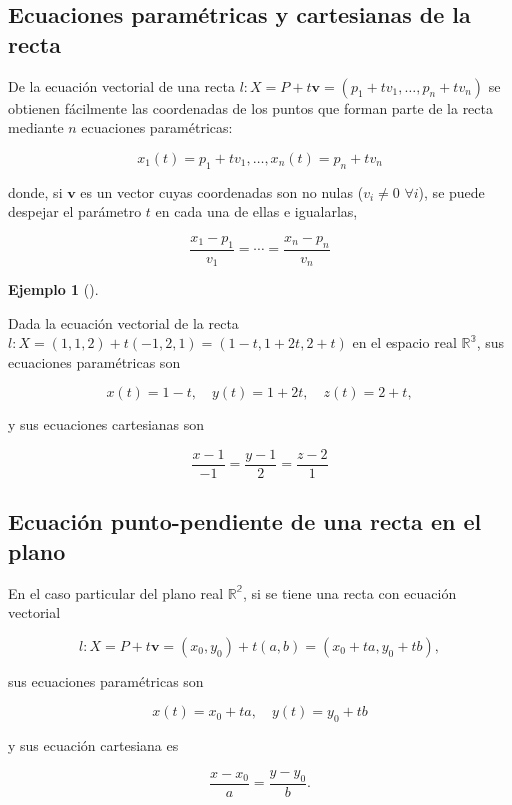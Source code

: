 \documentclass[
  a4paper,
]{scrreport}
\theoremstyle{definition}
\newtheorem{example}{Ejemplo}[chapter]
\theoremstyle{plain}
\theoremstyle{definition}
\theoremstyle{definition}
\theoremstyle{plain}
\theoremstyle{plain}
\theoremstyle{remark}
\begin{document}
\subsection{Ecuaciones paramétricas y cartesianas de la
recta}\label{ecuaciones-paramuxe9tricas-y-cartesianas-de-la-recta}

De la ecuación vectorial de una recta
\(l: X=P + t\mathbf{v}=(p_1+tv_1,\ldots,p_n+tv_n)\) se obtienen
fácilmente las coordenadas de los puntos que forman parte de la recta
mediante \(n\) ecuaciones paramétricas:

\[
x_1(t)=p_1+tv_1, \ldots, x_n(t)=p_n+tv_n
\]

donde, si \(\mathbf{v}\) es un vector cuyas coordenadas son no nulas
(\(v_i\neq 0\) \(\forall i\)), se puede despejar el parámetro \(t\) en
cada una de ellas e igualarlas,

\[
\frac{x_1-p_1}{v_1} = \cdots = \frac{x_n-p_n}{v_n}
\]

\begin{example}[]\protect\hypertarget{exm-ecuaciones-parametrica-cartesiana-recta}{}\label{exm-ecuaciones-parametrica-cartesiana-recta}

Dada la ecuación vectorial de la recta
\(l: X=(1,1,2)+t(-1,2,1) =(1-t,1+2t,2+t)\) en el espacio real
\(\mathbb{R^3}\), sus ecuaciones paramétricas son

\[
x(t) = 1-t, \quad y(t)=1+2t, \quad z(t)=2+t,
\]

y sus ecuaciones cartesianas son

\[
\frac{x-1}{-1}=\frac{y-1}{2}=\frac{z-2}{1}
\]

\end{example}

\subsection{Ecuación punto-pendiente de una recta en el
plano}\label{ecuaciuxf3n-punto-pendiente-de-una-recta-en-el-plano}

En el caso particular del plano real \(\mathbb{R^2}\), si se tiene una
recta con ecuación vectorial

\[
l: X=P+t\mathbf{v}=(x_0,y_0)+t(a,b) = (x_0+ta,y_0+tb),
\]

sus ecuaciones paramétricas son

\[
x(t)=x_0+ta,\quad y(t)=y_0+tb
\]

y sus ecuación cartesiana es

\[
\frac{x-x_0}{a} = \frac{y-y_0}{b}.
\]
\end{document}
